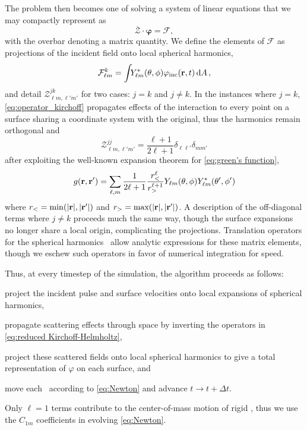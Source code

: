 The problem then becomes one of solving a system of linear equations that we may compactly represent as
\begin{equation}
  \overline{\boldsymbol{\mathcal{Z}}} \cdot \boldsymbol{\varphi} = \boldsymbol{\mathcal{F}},
  \label{eq:z_matrix_system}
\end{equation}
with the overbar denoting a matrix quantity.
We define the elements of $\boldsymbol{\mathcal{F}}$ as projections of the incident field onto local spherical harmonics,
\begin{equation}
  \mathcal{F}_{\ell m}^k = \int_{} Y^*_{\ell m}(\theta, \phi) \varphi_\text{inc}(\vb{r}, t) \dd{A},
  \label{eq:forcing projection}
\end{equation}
and detail $\mathcal{Z}^{jk}_{\ell m, \ell' m'}$ for two cases: $j = k$ and $j \not = k$.
In the instances where $j = k$, \cref{eq:operator_kirchoff} propagates effects of the interaction to every point on a surface sharing a coordinate system with the original, thus the harmonics remain orthogonal and
\begin{equation}
  \mathcal{Z}_{\ell m, \ell' m'}^{jj} = \frac{\ell + 1}{2\ell + 1}  \delta_{\ell \ell'} \delta_{m m'}
  \label{eq:z_matrix_self}
\end{equation}
after exploiting the well-known expansion theorem for \cref{eq:green's function},
\begin{equation}
  g(\vb{r}, \vb{r}') = \sum_{\ell, m}\frac{1}{2\ell + 1}\frac{r_<^\ell}{r_>^{\ell + 1}}Y_{\ell m}\qty(\theta, \phi)Y^*_{\ell m}\qty(\theta', \phi')
  \label{eq:expansion theorem}
\end{equation}
where $r_< = \mathrm{min}\qty(\abs{\vb{r}},\abs{\vb{r}'})$ and $r_> = \mathrm{max}\qty(\abs{\vb{r}}, \abs{\vb{r}'})$.
A description of the off-diagonal terms where $j \not = k$ proceeds much the same way, though the surface expansions no longer share a local origin, complicating the projections.
Translation operators for the spherical harmonics~\cite{Caola1978,Greengard1987} allow analytic expressions for these matrix elements, though we eschew such operators in favor of numerical integration for speed.

Thus, at every timestep of the simulation, the algorithm proceeds as follows:
\begin{inparaenum}[(i)]
  \item project the incident pulse and surface velocities onto local expansions of spherical harmonics,
  \item propagate scattering effects through space by inverting the operators in \cref{eq:reduced Kirchoff-Helmholtz},
  \item project these scattered fields onto local spherical harmonics to give a total representation of $\varphi$ on each surface, and
  \item move each \bubble\ according to \cref{eq:Newton} and advance $t \rightarrow t + \Delta t$.
\end{inparaenum}
Only $\ell = 1$ terms contribute to the center-of-mass motion of rigid \bubbles{}, thus we use the $C_{1m}$ coefficients in evolving \cref{eq:Newton}.

